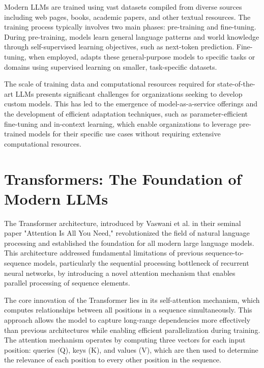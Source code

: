 Modern LLMs are trained using vast datasets compiled from diverse sources including web pages, books, academic papers, and other textual resources. The training process typically involves two main phases: pre-training and fine-tuning. During pre-training, models learn general language patterns and world knowledge through self-supervised learning objectives, such as next-token prediction. Fine-tuning, when employed, adapts these general-purpose models to specific tasks or domains using supervised learning on smaller, task-specific datasets.

The scale of training data and computational resources required for state-of-the-art LLMs presents significant challenges for organizations seeking to develop custom models. This has led to the emergence of model-as-a-service offerings and the development of efficient adaptation techniques, such as parameter-efficient fine-tuning and in-context learning, which enable organizations to leverage pre-trained models for their specific use cases without requiring extensive computational resources.

\section{Transformers: The Foundation of Modern LLMs}

The Transformer architecture, introduced by Vaswani et al. in their seminal paper "Attention Is All You Need," revolutionized the field of natural language processing and established the foundation for all modern large language models. This architecture addressed fundamental limitations of previous sequence-to-sequence models, particularly the sequential processing bottleneck of recurrent neural networks, by introducing a novel attention mechanism that enables parallel processing of sequence elements.


The core innovation of the Transformer lies in its self-attention mechanism, which computes relationships between all positions in a sequence simultaneously. This approach allows the model to capture long-range dependencies more effectively than previous architectures while enabling efficient parallelization during training. The attention mechanism operates by computing three vectors for each input position: queries (Q), keys (K), and values (V), which are then used to determine the relevance of each position to every other position in the sequence.

